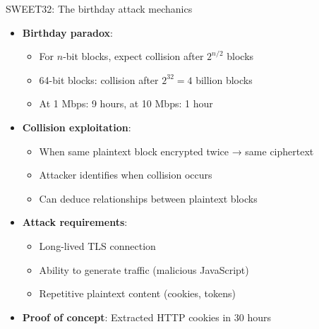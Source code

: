 \documentclass[aspectratio=169, lualatex, handout]{beamer}
\begin{document}
\begin{frame}{SWEET32: The birthday attack mechanics}
	\begin{itemize}[<+->]
		\item \textbf{Birthday paradox}:
		      \begin{itemize}
			      \item For $n$-bit blocks, expect collision after $2^{n/2}$ blocks
			      \item 64-bit blocks: collision after $2^{32} = 4$ billion blocks
			      \item At 1 Mbps: 9 hours, at 10 Mbps: 1 hour
		      \end{itemize}
		\item \textbf{Collision exploitation}:
		      \begin{itemize}
			      \item When same plaintext block encrypted twice → same ciphertext
			      \item Attacker identifies when collision occurs
			      \item Can deduce relationships between plaintext blocks
		      \end{itemize}
		\item \textbf{Attack requirements}:
		      \begin{itemize}
			      \item Long-lived TLS connection
			      \item Ability to generate traffic (malicious JavaScript)
			      \item Repetitive plaintext content (cookies, tokens)
		      \end{itemize}
		\item \textbf{Proof of concept}: Extracted HTTP cookies in 30 hours
	\end{itemize}
\end{frame}
\end{document}
